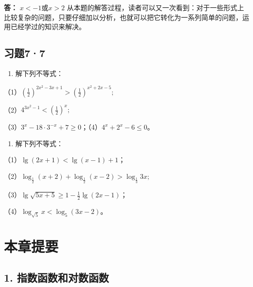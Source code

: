 \textbf{答：} \(x < -1\)或\(x > 2\)
从本题的解答过程，读者可以又一次看到：对于一些形式上比较复杂的问题，只要仔细加以分析，也就可以把它转化为一系列简单的问题，运用已经学过的知识来解决。

\subsection{习题7·7}

\begin{enumerate}
\item
  解下列不等式：
\end{enumerate}

（1）\(\left(\frac{1}{2}\right)^{2x^2 - 3x + 1} > \left(\frac{1}{2}\right)^{x^2 + 2x - 5};\)

（2）\(4^{3x^2 - 1} < \left(\frac{1}{2}\right)^x;\)

（3）\(3^{x} - 18 \cdot 3^{-x} + 7 \geqslant 0\)；（4）\(4^{x} + 2^{x} - 6 \leqslant 0\)。

\begin{enumerate}[start=2]
\item
  解下列不等式：
\end{enumerate}

（1）\(\lg (2x + 1) < \lg (x - 1) + 1\)；

（2）\(\log_{\frac{1}{2}}(x + 2) + \log_{\frac{1}{2}}(x - 2) > \log_{\frac{1}{3}}3x;\)

（3）\(\lg \sqrt{5x + 5} \geqslant 1 - \frac{1}{2} \lg (2x - 1)\)；

（4）\(\log_{\sqrt{5}} x < \log_5 (3x - 2)\)。

\section{本章提要}

\subsection{1. 指数函数和对数函数}

